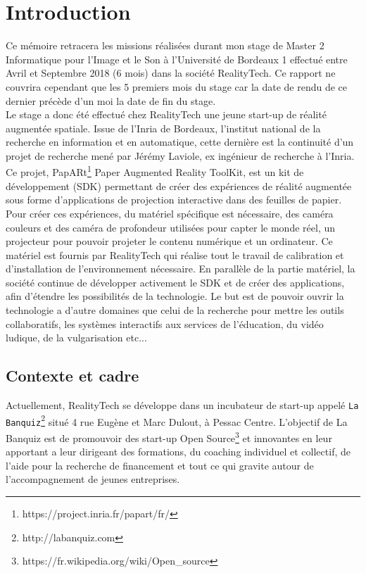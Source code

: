 \chapter{Introduction}
\label{chap:intro}

Ce mémoire retracera les missions réalisées durant mon stage de Master 2 Informatique pour l'Image et le Son à l'Université de Bordeaux 1 effectué entre Avril et Septembre 2018 (6 mois) dans la société RealityTech. Ce rapport ne couvrira cependant que les 5 premiers mois du stage car la date de rendu de ce dernier précède d'un moi la date de fin du stage.\\

Le stage a donc été effectué chez RealityTech une jeune start-up de réalité augmentée spatiale. Issue de l'Inria de Bordeaux, l'institut national de la recherche en information et en automatique, cette dernière est la continuité d'un projet de recherche mené par Jérémy Laviole, ex ingénieur de recherche à l'Inria. Ce projet, PapARt\footnote{https://project.inria.fr/papart/fr/} Paper Augmented Reality ToolKit, est un kit de développement (SDK) permettant de créer des expériences de réalité augmentée sous forme d'applications de projection interactive dans des feuilles de papier. Pour créer ces expériences, du matériel spécifique est nécessaire, des caméra couleurs et des caméra de profondeur utilisées pour capter le monde réel, un projecteur pour pouvoir projeter le contenu numérique et un ordinateur. Ce matériel est fournis par RealityTech qui réalise tout le travail de calibration et d'installation de l'environnement nécessaire. En parallèle de la partie matériel, la société continue de développer activement le SDK et de créer des applications, afin d'étendre les possibilités de la technologie. Le but est de pouvoir ouvrir la technologie a d'autre domaines que celui de la recherche pour mettre les outils collaboratifs, les systèmes interactifs aux services de l'éducation, du vidéo ludique, de la vulgarisation etc...

\section{Contexte et cadre}
\label{sec:contexte}
Actuellement, RealityTech se développe dans un incubateur de start-up appelé \texttt{La Banquiz}\footnote{http://labanquiz.com} situé 4 rue Eugène et Marc Dulout, à Pessac Centre. L'objectif de La Banquiz est de promouvoir des start-up Open Source\footnote{https://fr.wikipedia.org/wiki/Open\_source} et innovantes en leur apportant a leur dirigeant des formations, du coaching individuel et collectif, de l'aide pour la recherche de financement et tout ce qui gravite autour de l'accompagnement de jeunes entreprises.\\

